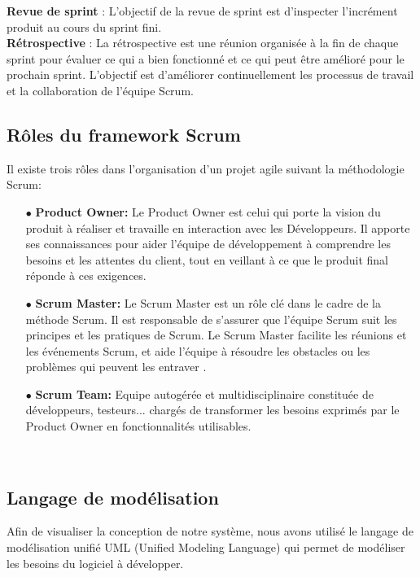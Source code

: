    \noindent\textbf{Revue de sprint} : L’objectif de la revue de sprint est d’inspecter l’incrément produit au cours du sprint fini.\\
     
    \noindent\textbf{Rétrospective} : La rétrospective est une réunion organisée à la fin de chaque sprint pour évaluer ce qui a bien fonctionné et ce qui peut être amélioré pour le prochain sprint. L'objectif est d'améliorer continuellement les processus de travail et la collaboration de l'équipe Scrum.\\
    
  
\subsection{ Rôles du framework Scrum}
    Il existe trois rôles dans l'organisation d'un projet agile suivant la méthodologie Scrum:\\
     \begin{itemize}
    
        \item[$\bullet$]\textbf{Product Owner: }Le Product Owner est celui qui porte la vision du produit à réaliser et travaille en interaction avec les Développeurs. Il apporte ses connaissances pour aider l'équipe de développement à comprendre les besoins et les attentes du client, tout en veillant à ce que le produit final réponde à ces exigences.\\
       \item[$\bullet$]\textbf{Scrum Master: }Le Scrum Master est un rôle clé dans le cadre de la méthode Scrum. Il est responsable de s'assurer que l'équipe Scrum suit les principes et les pratiques de Scrum. Le Scrum Master  facilite les réunions et les événements Scrum, et aide l'équipe à résoudre les obstacles ou les problèmes qui peuvent les entraver .\\
       \item[$\bullet$]\textbf{Scrum Team: }Equipe autogérée et multidisciplinaire constituée de développeurs, testeurs...  chargés de transformer les besoins exprimés par le Product Owner en fonctionnalités utilisables.
    \end{itemize}
  \




\subsection{ Langage de modélisation}
Afin de visualiser la conception de notre système, nous avons utilisé le langage de modélisation unifié UML (Unified Modeling Language) qui permet de modéliser les besoins du logiciel à développer.

